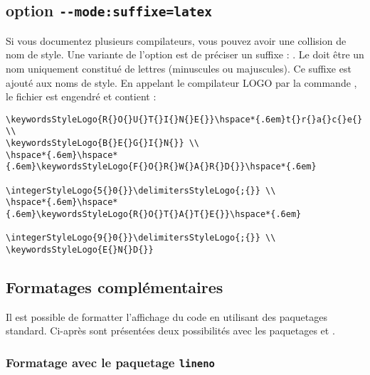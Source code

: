 \subsection{option \texttt{-{}-mode:suffixe=latex}}

Si vous documentez plusieurs compilateurs, vous pouvez avoir une collision de nom de style. Une variante de l'option  est de préciser un suffixe : . Le  doit être un nom uniquement constitué de lettres (minuscules ou majuscules). Ce suffixe est ajouté aux noms de style. En appelant le compilateur LOGO par la commande , le fichier  est engendré et contient :

{\small
\begin{verbatim}
\keywordsStyleLogo{R{}O{}U{}T{}I{}N{}E{}}\hspace*{.6em}t{}r{}a{}c{}e{} \\
\keywordsStyleLogo{B{}E{}G{}I{}N{}} \\
\hspace*{.6em}\hspace*{.6em}\keywordsStyleLogo{F{}O{}R{}W{}A{}R{}D{}}\hspace*{.6em}
                              \integerStyleLogo{5{}0{}}\delimitersStyleLogo{;{}} \\
\hspace*{.6em}\hspace*{.6em}\keywordsStyleLogo{R{}O{}T{}A{}T{}E{}}\hspace*{.6em}
                              \integerStyleLogo{9{}0{}}\delimitersStyleLogo{;{}} \\
\keywordsStyleLogo{E{}N{}D{}}
\end{verbatim}
}



\subsection{Formatages complémentaires}

Il est possible de formatter l'affichage du code en utilisant des paquetages standard. Ci-après sont présentées deux possibilités avec les paquetages  et .

\subsubsection{Formatage avec le paquetage \texttt{lineno}}

